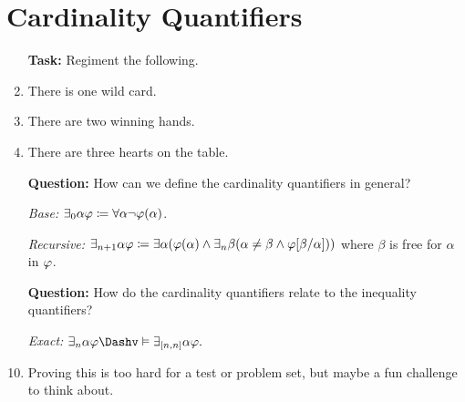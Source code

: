 \documentclass[a4paper, 11pt]{article} %
\begin{document}
 





\section*{Cardinality Quantifiers}
 
\begin{enumerate}
  \item[\bf Task:] Regiment the following.
  \item There is one wild card.
  \item There are two winning hands.
  \item There are three hearts on the table.
  \item[\bf Question:] How can we define the cardinality quantifiers in general?
  \item[\it Base:] $\exists_0 \alpha\varphi \coloneq \forall \alpha\neg\varphi(\alpha)$.
  \item[\it Recursive:] $\exists_{n+1} \alpha\varphi \coloneq \exists \alpha(\varphi(\alpha) \wedge \exists_n \beta(\alpha \neq \beta \wedge \varphi[\beta/\alpha]))$ where $\beta$ is free for $\alpha$ in $\varphi$.
  \item[\bf Question:] How do the cardinality quantifiers relate to the inequality quantifiers?
  \item[\it Exact:] $\qt{\exists_{n}}{\alpha}\metaA \Dashv\vDash \qt{\exists_{[n,n]}}{\alpha}\metaA.$
    \item Proving this is too hard for a test or problem set, but maybe a fun challenge to think about.
\end{enumerate}





\end{document}
